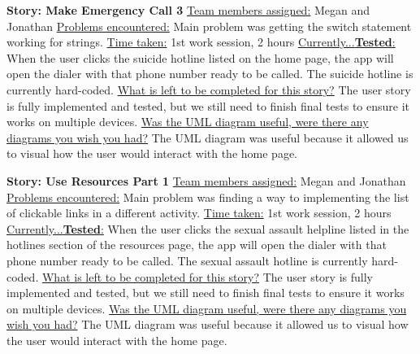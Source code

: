 \documentclass[letterpaper,12pt,titlepage]{article}
\begin{document}
\noindent
\textbf{Story: Make Emergency Call 3}
\newline
\newline
\underline{Team members assigned:}
Megan and Jonathan
\newline
\underline{Problems encountered:}
Main problem was getting the switch statement working for strings.
\newline
\underline{Time taken:}
1st work session, 2 hours
\newline
\underline{Currently...\textbf{Tested}:}
When the user clicks the suicide hotline listed on the home page, the app will open the dialer with that phone number ready to be called. The suicide hotline is currently hard-coded.
\newline
\underline{What is left to be completed for this story?}
The user story is fully implemented and tested, but we still need to finish final tests to ensure it works on multiple devices.
\newline
\underline{Was the UML diagram useful, were there any diagrams you wish you had?}
The UML diagram was useful because it allowed us to visual how the user would interact with the home page.
\newline
\newline

\noindent
\textbf{Story: Use Resources Part 1}
\newline
\newline
\underline{Team members assigned:}
Megan and Jonathan
\newline
\underline{Problems encountered:}
Main problem was finding a way to implementing the list of clickable links in a different activity.
\newline
\underline{Time taken:}
1st work session, 2 hours
\newline
\underline{Currently...\textbf{Tested}:}
When the user clicks the sexual assault helpline listed in the hotlines section of the resources page, the app will open the dialer with that phone number ready to be called. The sexual assault hotline is currently hard-coded.
\newline
\underline{What is left to be completed for this story?}
The user story is fully implemented and tested, but we still need to finish final tests to ensure it works on multiple devices.
\newline
\underline{Was the UML diagram useful, were there any diagrams you wish you had?}
The UML diagram was useful because it allowed us to visual how the user would interact with the home page.
\newline
\newline
\end{document}

